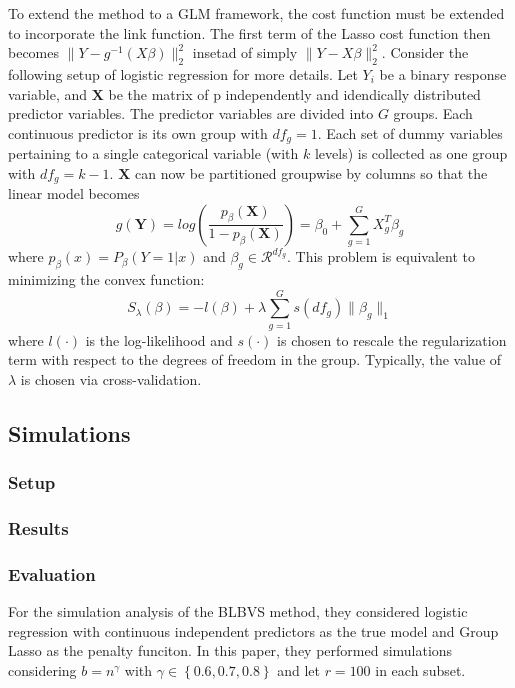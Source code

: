 \documentclass[11pt]{article}
\begin{document}
To extend the method to a GLM framework, the cost function must be extended to incorporate the link function. The first term of the Lasso cost function then becomes \(\| Y - g^{-1}(X\beta) \|^2_2\) insetad of simply \(\| Y - X\beta \|^2_2\). Consider the following setup of logistic regression for more details. Let \(Y_i\) be a binary response variable, and \(\mathbf{X}\) be the matrix of p independently and idendically distributed predictor variables. The predictor variables are divided into \(G\) groups. Each continuous predictor is its own group with \(df_g = 1\). Each set of dummy variables pertaining to a single categorical variable (with \(k\) levels) is collected as one group with \(df_g = k - 1\). \(\mathbf{X}\) can now be partitioned groupwise by columns so that the linear model becomes $$g(\mathbf{Y}) = log \left( \frac{p_\beta(\mathbf{X})}{1 - p_\beta (\mathbf{X})} \right) = \beta_0 + \sum^G_{g=1} X^T_g \beta_g $$ where \(p_\beta(x) = P_\beta(Y = 1 | x)\) and \(\beta_g \in \mathcal{R}^{df_g}\). This problem is equivalent to minimizing the convex function: $$S_\lambda(\beta) = -l(\beta) + \lambda \sum^G_{g=1} s(df_g) \|\beta_g \|_1$$ where \(l(\cdot)\) is the log-likelihood and \(s(\cdot)\) is chosen to rescale the regularization term with respect to the degrees of freedom in the group. Typically, the value of \(\lambda\) is chosen via cross-validation.

\subsection{Simulations}
\label{sec:org0727da9}
\subsubsection{Setup}
\label{sec:org8f04114}
\subsubsection{Results}
\label{sec:org6723a4b}
\subsubsection{Evaluation}
\label{sec:orgda99d6a}
For the simulation analysis of the BLBVS method, they considered logistic regression with continuous independent predictors as the true model and Group Lasso as the penalty funciton. In this paper, they performed simulations considering \(b = n^\gamma\) with \(\gamma \in \left\{ 0.6, 0.7, 0.8 \right\}\) and let \(r = 100\) in each subset.
\end{document}
